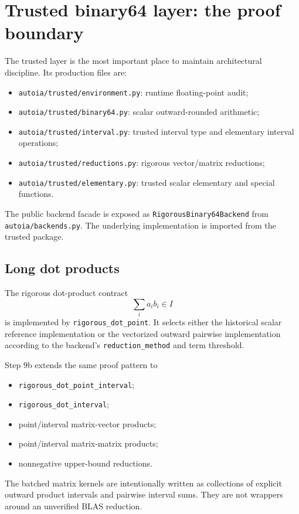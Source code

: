 \documentclass[11pt]{article}
\newcommand{\codepath}[1]{\nolinkurl{#1}}
\begin{document}
\section{Trusted binary64 layer: the proof boundary}

The trusted layer is the most important place to maintain architectural discipline.
Its production files are:

\begin{itemize}[leftmargin=*]
\item \codepath{autoia/trusted/environment.py}: runtime floating-point audit;
\item \codepath{autoia/trusted/binary64.py}: scalar outward-rounded arithmetic;
\item \codepath{autoia/trusted/interval.py}: trusted interval type and elementary interval operations;
\item \codepath{autoia/trusted/reductions.py}: rigorous vector/matrix reductions;
\item \codepath{autoia/trusted/elementary.py}: trusted scalar elementary and special functions.
\end{itemize}

The public backend facade is exposed as \texttt{RigorousBinary64Backend} from
\codepath{autoia/backends.py}.  The underlying implementation is imported from
the trusted package.

\subsection{Long dot products}

The rigorous dot-product contract
\[
  \sum_i a_i b_i\in I
\]
is implemented by \texttt{rigorous\_dot\_point}.  It selects either the
historical scalar reference implementation or the vectorized outward pairwise
implementation according to the backend's \texttt{reduction\_method} and term
threshold.

Step 9b extends the same proof pattern to
\begin{itemize}[leftmargin=*]
\item \texttt{rigorous\_dot\_point\_interval};
\item \texttt{rigorous\_dot\_interval};
\item point/interval matrix-vector products;
\item point/interval matrix-matrix products;
\item nonnegative upper-bound reductions.
\end{itemize}
The batched matrix kernels are intentionally written as collections of explicit
outward product intervals and pairwise interval sums.  They are not wrappers
around an unverified BLAS reduction.
\end{document}
